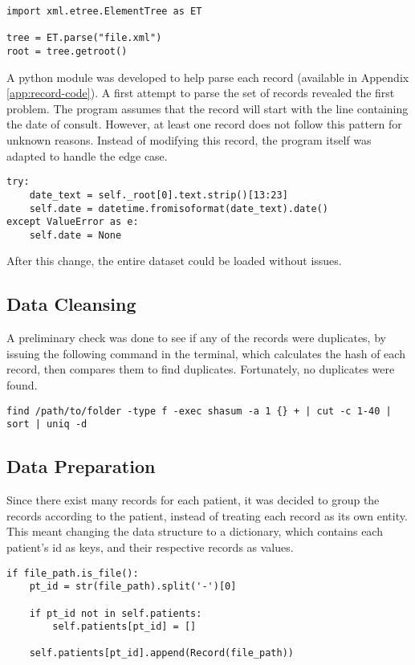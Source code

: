 \documentclass[a4paper,12pt]{article}
\begin{document}
\begin{verbatim}
import xml.etree.ElementTree as ET

tree = ET.parse("file.xml")
root = tree.getroot()
\end{verbatim}

A python module was developed to help parse each record (available in Appendix
\ref{app:record-code}).
A first attempt to parse the set of records revealed the first problem.
The program assumes that the record will start with the line containing the
date of consult.
However, at least one record does not follow this pattern for unknown reasons.
Instead of modifying this record, the program itself was adapted to handle the
edge case.

\begin{verbatim}
try:
    date_text = self._root[0].text.strip()[13:23]
    self.date = datetime.fromisoformat(date_text).date()
except ValueError as e:
    self.date = None
\end{verbatim}

After this change, the entire dataset could be loaded without issues.

\subsection{Data Cleansing}

A preliminary check was done to see if any of the records were duplicates,
by issuing the following command in the terminal, which calculates the
hash of each record, then compares them to find duplicates.
Fortunately, no duplicates were found.

\begin{verbatim}
find /path/to/folder -type f -exec shasum -a 1 {} + | cut -c 1-40 | sort | uniq -d
\end{verbatim}

\subsection{Data Preparation}

Since there exist many records for each patient, it was decided to group the
records according to the patient, instead of treating each record as its own
entity.
This meant changing the data structure to a dictionary, which contains each
patient's id as keys, and their respective records as values.

\begin{verbatim}
if file_path.is_file():
    pt_id = str(file_path).split('-')[0]

    if pt_id not in self.patients:
        self.patients[pt_id] = []

    self.patients[pt_id].append(Record(file_path))
\end{verbatim}
\end{document}
